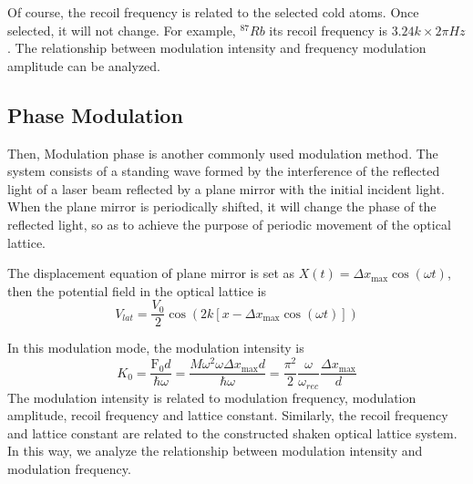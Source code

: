 \documentclass[
 reprint,
 amsmath,amssymb,
 aps,
pra,
floatfix,
]{revtex4-2}
\begin{document}
Of course, the recoil frequency is related to the selected cold atoms. Once selected, it will not change.
For example, $^{87} R b$ its recoil frequency is $3.24 k \times 2\pi Hz$. The relationship between modulation intensity and frequency modulation amplitude can be analyzed.


\subsection{Phase Modulation}

Then, Modulation phase is another commonly used modulation method.%
The system consists of a standing wave formed by the interference of the reflected light of a laser beam reflected by a plane mirror with the initial incident light. 
When the plane mirror is periodically shifted, it will change the phase of the reflected light, %
so as to achieve the purpose of periodic movement of the optical lattice.


The displacement equation of plane mirror is set as $X(t)=\Delta x_{\max } \cos (\omega t)$, then the potential field in the optical lattice is
\begin{equation}
  V_{l a t}=\frac{V_{0}}{2} \cos \left(2 k\left[x-\Delta x_{\max } \cos (\omega t)\right]\right)
\end{equation}

In this modulation mode, the modulation intensity is
\begin{equation}
  K_{0}=\frac{\mathrm{F}_{0} d}{\hbar \omega}=\frac{M \omega^{2} \omega \Delta x_{\max } d}{\hbar \omega}=\frac{\pi^{2}}{2} \frac{\omega}{\omega_{r e c}} \frac{\Delta x_{\max }}{d}
\end{equation}
The modulation intensity is related to modulation frequency, modulation amplitude, recoil frequency and lattice constant. 
Similarly, the recoil frequency and lattice constant are related to the constructed shaken optical lattice system. 
In this way, we analyze the relationship between modulation intensity and modulation frequency.
\end{document}
